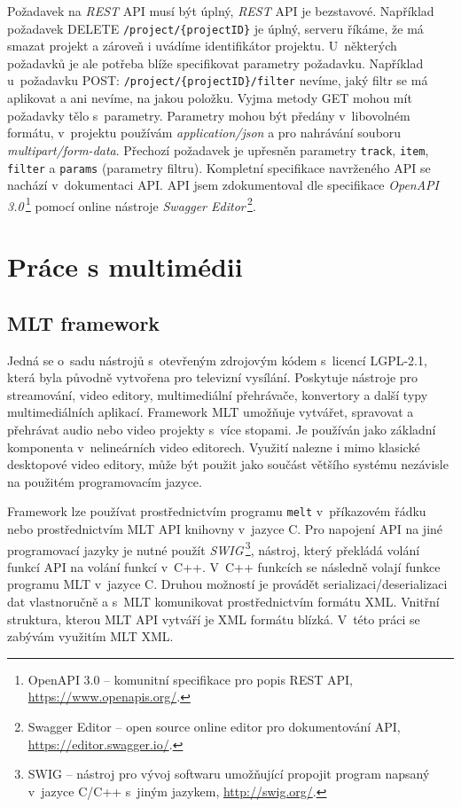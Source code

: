 Požadavek na \textit{REST} API musí být úplný, \textit{REST} API je bezstavové. Například požadavek DELETE \texttt{/project/\{projectID\}} je úplný, serveru říkáme, že má smazat projekt a zároveň i uvádíme identifikátor projektu. U~některých požadavků je ale potřeba blíže specifikovat parametry požadavku. Například u~požadavku POST: \texttt{/project/\{projectID\}/filter} nevíme, jaký filtr se má aplikovat a ani nevíme, na jakou položku. Vyjma metody GET mohou mít požadavky tělo s~parametry. Parametry mohou být předány v~libovolném formátu, v~projektu používám \textit{application/json} a pro nahrávání souboru \textit{multipart/form-data}. Přechozí požadavek je upřesněn parametry \texttt{track}, \texttt{item}, \texttt{filter} a \texttt{params} (parametry filtru). Kompletní specifikace navrženého API se nachází v~dokumentaci API. API jsem zdokumentoval dle specifikace \textit{OpenAPI 3.0}\,\footnote{OpenAPI 3.0 -- komunitní specifikace pro popis REST API, \url{https://www.openapis.org/}.} pomocí online nástroje \textit{Swagger Editor}\,\footnote{Swagger Editor -- open source online editor pro dokumentování API, \url{https://editor.swagger.io/}.}.

\chapter{Práce s multimédii}
\section{MLT framework}
Jedná se o~sadu nástrojů s~otevřeným zdrojovým kódem s~licencí LGPL-2.1, která byla původně vytvořena pro televizní vysílání. Poskytuje nástroje pro streamování, video editory, multimediální přehrávače, konvertory a další typy multimediálních aplikací. Framework MLT umožňuje vytvářet, spravovat a přehrávat audio nebo video projekty s~více stopami. Je používán jako základní komponenta v~nelineárních video editorech. Využití nalezne i mimo klasické desktopové video editory, může být použit jako součást většího systému nezávisle na použitém programovacím jazyce.

Framework lze používat prostřednictvím programu \texttt{melt} v~příkazovém řádku nebo prostřednictvím MLT API knihovny v~jazyce C. Pro napojení API na jiné programovací jazyky je nutné použít \textit{SWIG}\,\footnote{SWIG -- nástroj pro vývoj softwaru umožňující propojit program napsaný v~jazyce C/C++ s~jiným jazykem, \url{http://swig.org/}.}, nástroj, který překládá volání funkcí API na volání funkcí v~C++. V~C++ funkcích se následně volají funkce programu MLT v~jazyce C. Druhou možností je provádět serializaci/deserializaci dat vlastnoručně a s~MLT komunikovat prostřednictvím formátu XML. Vnitřní struktura, kterou MLT API vytváří je XML formátu blízká. V~této práci se zabývám využitím MLT XML.

